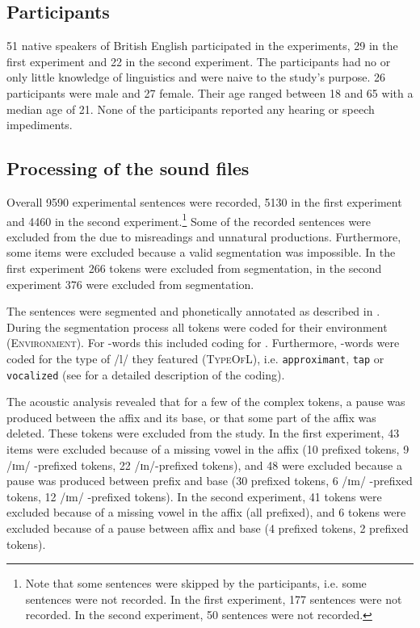 	
	\subsection{Participants}
	
51 native speakers of British English participated in the experiments, 29 in the first experiment and 22 in the second experiment. The participants had no or only little knowledge of linguistics and were naive to the study's purpose. 26 participants were male and 27 female. Their age ranged between 18 and 65 with a median age of 21. None of the participants reported any hearing or speech impediments.
	


\subsection{Processing of the sound files}

Overall 9590 experimental sentences were recorded, 5130 in the first experiment and 4460 in the second experiment.\footnote{Note that some sentences were skipped by the participants, i.e. some sentences were not recorded. In the first experiment, 177 sentences were not recorded. In the second experiment, 50 sentences were not recorded. } 
Some of the recorded sentences were excluded from the  due to misreadings and unnatural productions. Furthermore, some items  were excluded because a valid segmentation was impossible. In the first experiment 266 tokens were excluded from segmentation, in the second experiment 376 were excluded from segmentation.



The sentences were segmented and phonetically annotated as described in . 
During the segmentation process all tokens were coded for their environment (\textsc{Environment}). For -words this included coding for . Furthermore, -words were coded for the type of /l/ they featured (\textsc{TypeOfL}), i.e. \texttt{approximant}, \texttt{tap} or \texttt{vocalized} (see  for a detailed description of the coding).


 The acoustic analysis revealed that for a few of the complex tokens, a pause was produced between the affix and its base, or that some part of the affix was deleted. These tokens were excluded from the study. 
 In the first experiment, 43 items were excluded because of a missing vowel in the affix  (10  prefixed tokens,  9 /ɪm/ -prefixed tokens, 22 /ɪn/-prefixed tokens), and 48 were excluded because a pause was produced between prefix and base (30  prefixed tokens,  6 /ɪm/ -prefixed tokens, 12 /ɪm/ -prefixed tokens). 
 In the second experiment, 41 tokens were excluded because of a missing vowel in the affix (all prefixed), and 6 tokens were excluded because of a pause between affix and base (4 prefixed tokens, 2 prefixed tokens). %


